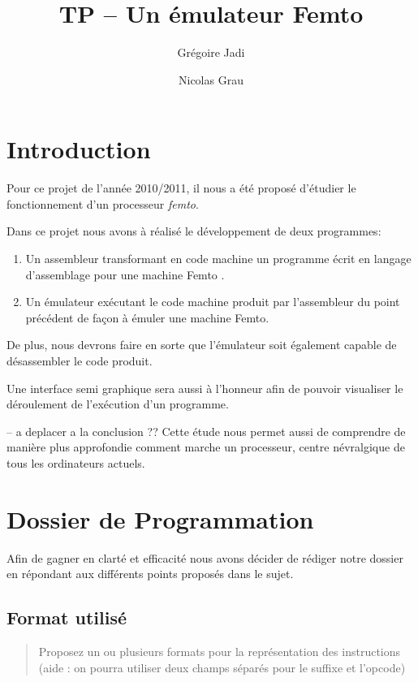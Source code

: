 \documentclass[11pt,a4paper]{article}
\title{TP -- Un émulateur Femto} \author{Grégoire Jadi \and Nicolas Grau}
\begin{document}
\maketitle

\tableofcontents


\section{Introduction}

Pour ce projet de l'année 2010/2011, il nous a été proposé d'étudier le fonctionnement d'un processeur
\textit{femto}.

Dans ce projet nous avons à réalisé le développement de deux programmes:

\begin{enumerate}
\item Un assembleur transformant en code machine un programme écrit en langage d’assemblage pour une
machine Femto .
\item Un émulateur exécutant le code machine produit par l’assembleur du point précédent de façon à
émuler une machine Femto.
\end{enumerate}

De plus, nous devrons faire en sorte que l'émulateur soit également capable de désassembler le code
produit.

Une interface semi graphique sera aussi à l'honneur afin de pouvoir visualiser le déroulement de
l'exécution d'un programme.

-- a deplacer a la conclusion ??
Cette étude nous permet aussi de comprendre de manière plus approfondie comment marche un
processeur, centre névralgique de tous les ordinateurs actuels.


\section{Dossier de Programmation}

Afin de gagner en clarté et efficacité nous avons décider de rédiger notre dossier en répondant aux
différents points proposés dans le sujet.

\subsection{Format utilisé}
\begin{quote}
Proposez un ou plusieurs formats pour la représentation des instructions (aide : on pourra utiliser
deux champs séparés pour le suffixe et l’opcode)
\end{quote}
\end{document}
